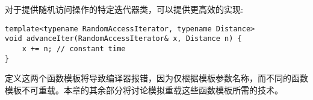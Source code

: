 对于提供随机访问操作的特定迭代器类，可以提供更高效的实现:

\begin{lstlisting}[style=styleCXX]
template<typename RandomAccessIterator, typename Distance>
void advanceIter(RandomAccessIterator& x, Distance n) {
	x += n; // constant time
}
\end{lstlisting}

定义这两个函数模板将导致编译器报错，因为仅根据模板参数名称，而不同的函数模板不可重载。本章的其余部分将讨论模拟重载这些函数模板所需的技术。












